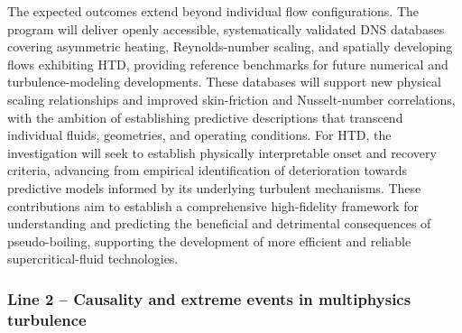 \documentclass[11pt]{article}
\begin{document}
The expected outcomes extend beyond individual flow configurations.
The program will deliver openly accessible, systematically validated DNS databases covering asymmetric heating, Reynolds-number scaling, and spatially developing flows exhibiting HTD, providing reference benchmarks for future numerical and turbulence-modeling developments.
These databases will support new physical scaling relationships and improved skin-friction and Nusselt-number correlations, with the ambition of establishing predictive descriptions that transcend individual fluids, geometries, and operating conditions.
For HTD, the investigation will seek to establish physically interpretable onset and recovery criteria, advancing from empirical identification of deterioration towards predictive models informed by its underlying turbulent mechanisms.
These contributions aim to establish a comprehensive high-fidelity framework for understanding and predicting the beneficial and detrimental consequences of pseudo-boiling, supporting the development of more efficient and reliable supercritical-fluid technologies.

\subsubsection{Line 2 -- Causality and extreme events in multiphysics turbulence}
\end{document}
